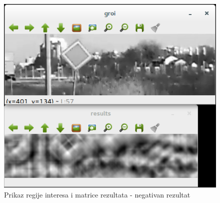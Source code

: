 \begin{figure}[!htb]
\centering
\includegraphics[scale=0.5]{figures/18.png}
\caption{Prikaz regije interesa i matrice rezultata - negativan rezultat}
\label{fig:pr4}
\end{figure}





